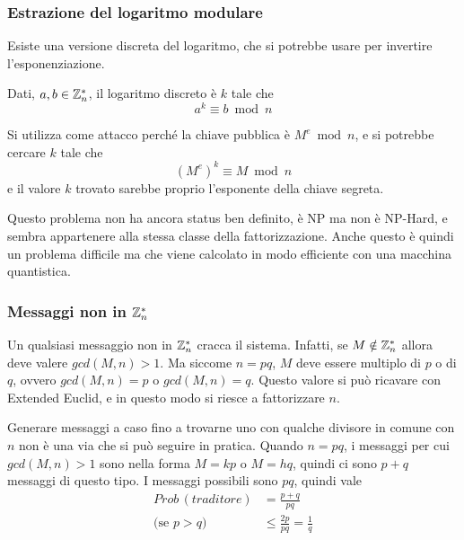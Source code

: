 \subsubsection{Estrazione del logaritmo modulare}

Esiste una versione discreta del logaritmo, che si potrebbe usare per invertire l'esponenziazione.

\begin{definition}
    \label{def:logaritmo_discreto}
    Dati, $a,b \in \mathbb{Z}_{n}^{*} $, il logaritmo discreto è $k$ tale che
    \begin{equation*}
        a^k \equiv b \bmod n 
    \end{equation*}
\end{definition}

Si utilizza come attacco perché la chiave pubblica è $
M^e \bmod n 
$, e si potrebbe cercare $k$ tale che
\begin{equation*}
    \left( 
        M^e
    \right)^k
    \equiv 
    M \bmod n  
\end{equation*}
e il valore $k$ trovato sarebbe proprio l'esponente della chiave segreta.

Questo problema non ha ancora status ben definito, è NP ma non è NP-Hard, e sembra appartenere alla stessa classe della fattorizzazione. Anche questo è quindi un problema difficile ma che viene calcolato in modo efficiente con una macchina quantistica.

\subsubsection{Messaggi non in $\mathbb{Z}_{n}^{*} $}

Un qualsiasi messaggio non in $\mathbb{Z}_{n}^{*} $ cracca il sistema.
Infatti, se
$M \notin \mathbb{Z}_{n}^{*}$
allora deve valere $
gcd(M, n) > 1
$. Ma siccome $n=pq$, $M$ deve essere multiplo di $p$ o di $q$, ovvero $
gcd(M, n) = p
$ o $
gcd(M, n) = q
$. 
Questo valore si può ricavare con Extended Euclid, e in questo modo si riesce a fattorizzare $n$.

Generare messaggi a caso fino a trovarne uno con qualche divisore in comune con $n$ non è una via che si può seguire in pratica.
Quando $n=pq$, i messaggi per cui $
gcd(M, n) > 1
$ sono nella forma $
M = kp
$ o $
M = hq
$, quindi ci sono $p+q$ messaggi di questo tipo.
I messaggi possibili sono $pq$, quindi vale
\begin{align*}
    Prob \, (traditore) 
    &= 
    \frac{p+q}{pq}
    \\
    \text{(se $p>q$)}
    \quad
    \quad
    &
    \leq
    \frac{2p}{pq}
    =
    \frac{1}{q}
\end{align*}

